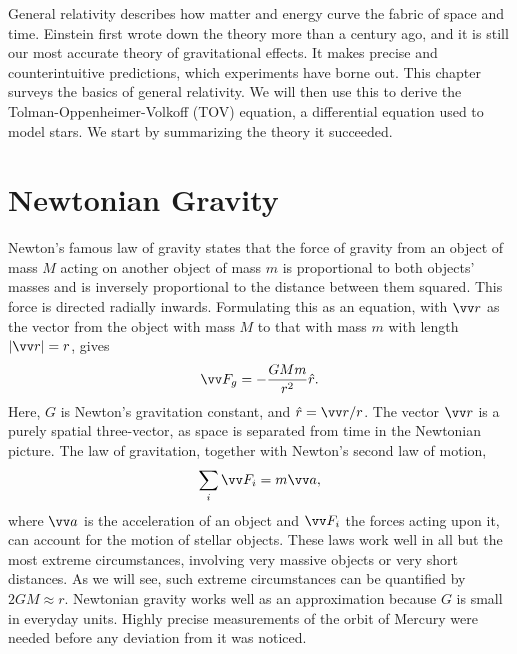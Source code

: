 General relativity describes how matter and energy curve the fabric of space and time.
Einstein first wrote down the theory more than a century ago, and it is still our most accurate theory of gravitational effects.
It makes precise and counterintuitive predictions, which experiments have borne out.
This chapter surveys the basics of general relativity.
We will then use this to derive the Tolman-Oppenheimer-Volkoff (TOV) equation, a differential equation used to model stars.
We start by summarizing the theory it succeeded.


\section{Newtonian Gravity}


Newton's famous law of gravity states that the force of gravity from an object of mass $M$ acting on another object of mass $m$ is proportional to both objects' masses and is inversely proportional to the distance between them squared.
This force is directed radially inwards.
Formulating this as an equation, with $\vv r$ as the vector from the object with mass $M$ to that with mass $m$ with length $|\vv r| = r$, gives
%
\begin{equation}
    \vv F_g = - \frac{G M m}{r^2} \hat r.
\end{equation}
%
Here, $G$ is Newton's gravitation constant, and $\hat r = \vv r / r$.
The vector $\vv r$ is a purely spatial three-vector, as space is separated from time in the Newtonian picture.
The law of gravitation, together with Newton's second law of motion,
%
\begin{equation}
    \label{Newton's second law}
    \sum_i \vv F_i = m \vv a,
\end{equation}
%
where $\vv a$ is the acceleration of an object and $\vv F_i$ the forces acting upon it, can account for the motion of stellar objects.
These laws work well in all but the most extreme circumstances, involving very massive objects or very short distances.
As we will see, such extreme circumstances can be quantified by $2G M \approx r$.
Newtonian gravity works well as an approximation because $G$ is small in everyday units.
Highly precise measurements of the orbit of Mercury were needed before any deviation from it was noticed.

